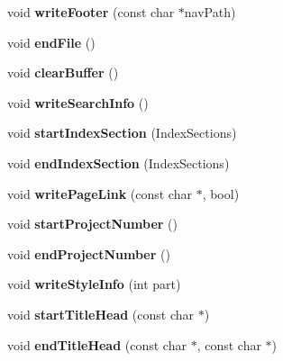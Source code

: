 \begin{DoxyCompactItemize}
void {\bfseries write\+Footer} (const char $\ast$nav\+Path)
\item 
\mbox{\label{class_html_generator_aecd9da9f7e9201df51cfe46ab71c6e30}} 
void {\bfseries end\+File} ()
\item 
\mbox{\label{class_html_generator_af0be36300dc3636e212df095e2b31397}} 
void {\bfseries clear\+Buffer} ()
\item 
\mbox{\label{class_html_generator_aa60e46a4d67ca28c8676a97ad0968069}} 
void {\bfseries write\+Search\+Info} ()
\item 
\mbox{\label{class_html_generator_a686b599d09c8254a8d28589aa18e2ca1}} 
void {\bfseries start\+Index\+Section} (Index\+Sections)
\item 
\mbox{\label{class_html_generator_a4f525285e864992a9e9004293c6dcf72}} 
void {\bfseries end\+Index\+Section} (Index\+Sections)
\item 
\mbox{\label{class_html_generator_a17175f9f54dbfcc611c728ef0efdcfb3}} 
void {\bfseries write\+Page\+Link} (const char $\ast$, bool)
\item 
\mbox{\label{class_html_generator_a68e4cfb8ef2701dd7a6d6bceeda1e55a}} 
void {\bfseries start\+Project\+Number} ()
\item 
\mbox{\label{class_html_generator_a56bb1fc7587fe00fbe3fb3cf6c9973ac}} 
void {\bfseries end\+Project\+Number} ()
\item 
\mbox{\label{class_html_generator_a67494e4d92c2b6f4bf19a51ab9417659}} 
void {\bfseries write\+Style\+Info} (int part)
\item 
\mbox{\label{class_html_generator_aa2d4c7b39f08d95acd0b73d0ba7a2c64}} 
void {\bfseries start\+Title\+Head} (const char $\ast$)
\item 
\mbox{\label{class_html_generator_a44202d0de92814df8521f373adc257d9}} 
void {\bfseries end\+Title\+Head} (const char $\ast$, const char $\ast$)

\end{DoxyCompactItemize}
